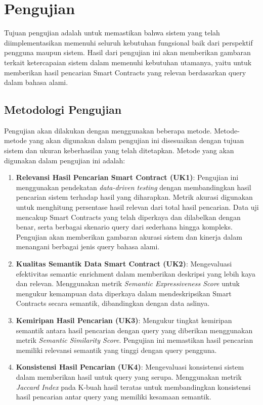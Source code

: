 \section{Pengujian}

Tujuan pengujian adalah untuk memastikan bahwa sistem yang telah diimplementasikan memenuhi seluruh kebutuhan fungsional baik dari perspektif pengguna maupun sistem. Hasil dari pengujian ini akan memberikan gambaran terkait ketercapaian sistem dalam memenuhi kebutuhan utamanya, yaitu untuk memberikan hasil pencarian Smart Contracts yang relevan berdasarkan query dalam bahasa alami.

\subsection{Metodologi Pengujian}

Pengujian akan dilakukan dengan menggunakan beberapa metode. Metode-metode yang akan digunakan dalam pengujian ini disesuaikan dengan tujuan sistem dan ukuran keberhasilan yang telah ditetapkan. Metode yang akan digunakan dalam pengujian ini adalah:

\begin{enumerate}
	\item \textbf{Relevansi Hasil Pencarian Smart Contract (UK1)}: Pengujian ini menggunakan pendekatan \textit{data-driven testing} dengan membandingkan hasil pencarian sistem terhadap hasil yang diharapkan. Metrik akurasi digunakan untuk menghitung persentase hasil relevan dari total hasil pencarian. Data uji mencakup Smart Contracts yang telah diperkaya dan dilabelkan dengan benar, serta berbagai skenario query dari sederhana hingga kompleks. Pengujian akan memberikan gambaran akurasi sistem dan kinerja dalam menangani berbagai jenis query bahasa alami.
	\item \textbf{Kualitas Semantik Data Smart Contract (UK2)}: Mengevaluasi efektivitas semantic enrichment dalam memberikan deskripsi yang lebih kaya dan relevan. Menggunakan metrik \textit{Semantic Expressiveness Score} untuk mengukur kemampuan data diperkaya dalam mendeskripsikan Smart Contracts secara semantik, dibandingkan dengan data aslinya.
	\item \textbf{Kemiripan Hasil Pencarian (UK3)}: Mengukur tingkat kemiripan semantik antara hasil pencarian dengan query yang diberikan menggunakan metrik \textit{Semantic Similarity Score}. Pengujian ini memastikan hasil pencarian memiliki relevansi semantik yang tinggi dengan query pengguna.
	\item \textbf{Konsistensi Hasil Pencarian (UK4)}: Mengevaluasi konsistensi sistem dalam memberikan hasil untuk query yang serupa. Menggunakan metrik \textit{Jaccard Index} pada K-buah hasil teratas untuk membandingkan konsistensi hasil pencarian antar query yang memiliki kesamaan semantik.
\end{enumerate}

